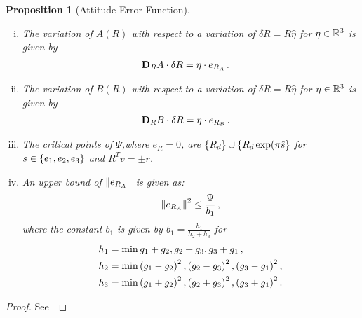 \documentclass[letterpaper, 10 pt, conference]{ieeeconf}  %
\newtheorem{prop}{Proposition}
\begin{document}
\begin{prop}[Attitude Error Function]
\begin{enumerate}[(i)]
	\begin{align}
		\dirDiff{\Psi}{R} &= \dirDiff{A}{R} \,  B(R) + A \,  \dirDiff{B}{R} \, . \\
	\end{align}
	\item \label{item:prop_era}The variation of \( A(R) \) with respect to a variation of \( \delta R = R \hat{\eta} \) for \( \eta \in \mathbb{R}^3 \) is given by
	\begin{align}
		\mathbf{D}_{R} A \cdot \delta R &= \eta \cdot e_{R_A} \, .
	\end{align}
	\item \label{item:prop_erb} The variation of \( B(R) \) with respect to a variation of \( \delta R = R \hat{\eta} \) for \( \eta \in \mathbb{R}^3 \) is given by
	\begin{align}
		\mathbf{D}_{R} B \cdot \delta R &= \eta \cdot e_{R_{B}} \, .
	\end{align}
	\item \label{item:prop_crit}The critical points of \( \Psi \),where \( e_R = 0\), are \( \left\{ R_d \right\} \cup \left\{ R_d \exp(\pi \hat{s} \right\} \) for \( s \in \left\{ e_1, e_2, e_3 \right\} \) and \( R^T v = \pm r \).
	\item \label{item:prop_era_upbound}An upper bound of \( \left\| e_{R_A} \right\| \) is given as:
	\begin{align}
		\left\| e_{R_A} \right\|^2 \leq \frac{\Psi}{b_1} \, , \label{eqn:psi_lower_bound}
	\end{align}
	where the constant \( b_1 \) is given by \( b_1 = \frac{h_1}{h_2 + h_3} \) for 
	\begin{align*}
		h_1 &= \min{g_1 + g_2, g_2 + g_3 , g_3 + g_1} \, ,\\
		h_2 &= \min{\ensuremath{\left( g_1 -g_2 \right)}^2,\ensuremath{\left( g_2 -g_3 \right)}^2 , \ensuremath{\left( g_3 -g_1 \right)}^2} \, ,\\
		h_3 &= \min{\ensuremath{\left( g_1 + g_2 \right)}^2, \ensuremath{\left( g_2 + g_3 \right)}^2 , \ensuremath{\left( g_3 + g_1 \right)}^2} \, .				
	\end{align*}
\end{enumerate}
\end{prop}
\begin{proof}
See~
\end{proof}
\end{document}
